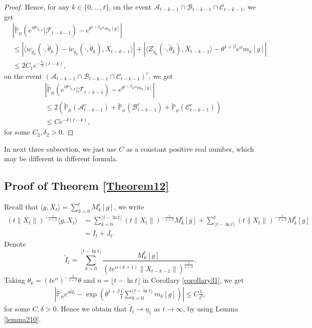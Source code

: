 \documentclass[12pt, a4paper]{amsart}
\theoremstyle{definition}
\numberwithin{equation}{section}
\begin{document}
\begin{proof}
Hence, for any $k\in\{0,...,t\}$, on the event $\mathcal{A}_{t-k-1}\cap\mathcal{B}_{t-k-1}\cap\mathcal{C}_{t-k-1}$, we get
\begin{align*}
   &\left|\mathbb{\tilde{P}}_{\mu}\left(e^{i\theta \gamma_{t,k}}|\mathcal{F}_{t-k-1}\right)-e^{\theta^{1+\beta}e^{\alpha}m_k[g]}\right|\\
   &\leq \left|\langle w_{g_k}(\cdot,\tilde{\theta}_k)-\tilde{w}_{g_k}(\cdot,\tilde{\theta}_k), X_{t-k-1}\rangle\right|
   +\left|\langle Z_{g_k}(\cdot,\tilde{\theta}_k),X_{t-k-1}\rangle-\theta^{1+\beta}e^{\alpha}m_k[g]\right|\\
   &\leq 2C_1 e^{-\frac{\delta_1}{2}(t-k)},
\end{align*}
on the event $(\mathcal{A}_{t-k-1}\cap\mathcal{B}_{t-k-1}\cap\mathcal{C}_{t-k-1})^c$, we get
\begin{align*}
    &\left|\mathbb{\tilde{P}}_{\mu}\left(e^{i\theta \gamma_{t,k}}|\mathcal{F}_{t-k-1}\right)-e^{\theta^{1+\beta}e^{\alpha}m_k[g]}\right|\\
    &\leq 2(\mathbb{\tilde{P}}_{\mu}(\mathcal{A}^c_{t-k-1})+\mathbb{\tilde{P}}_{\mu}(\mathcal{B}^c_{t-k-1})+\mathbb{\tilde{P}}_{\mu}(\mathcal{C}^c_{t-k-1}))\\
    &\leq C e^{-\delta(t-k)},
\end{align*}
for some $C_2,\delta_2>0$.
\end{proof}


In next three subsection, we just use $C$ as a constant positive real number, which may be different in different formula.
\subsection{Proof of Theorem \ref{Theorem12}}

    Recall that $\langle g,X_t\rangle=\sum_{k=0}^t M_k^t[g]$, we write
    \begin{align*}
        (t\|X_t\|)^{-\frac{1}{1+\beta}}\langle g,X_t\rangle&=\sum_{k=0}^{\lfloor t-\ln t \rfloor} (t\|X_t\|)^{-\frac{1}{1+\beta}}M_k^t[g]+\sum_{\lceil t-\ln t \rceil}^t (t\|X_t\|)^{-\frac{1}{1+\beta}}M_k^t[g]\\
        &=I_t+J_t.
    \end{align*}
    Denote
    $$\tilde{I}_t=\sum_{k=0}^{\lfloor t-\ln t \rfloor}\frac{M_k^t[g]}{(t e^{\alpha(k+1)}\|X_{t-k-1}\|)^{\frac{1}{1+\beta}}}.$$
    Taking $\theta_k=(t e^{\alpha})^{-\frac{1}{1+\beta}} \theta $ and $n={\lfloor t-\ln t \rfloor}$ in Corollary \ref{corollary31}, we get
    \begin{align*}
        \left|\mathbb{\tilde{P}}_{\mu}e^{i\theta\tilde{I}_t}-\exp\left(\theta^{1+\beta}\frac{1}{t}\sum_{k=0}^{\lfloor t-\ln t \rfloor}m_k[g]\right)\right|\leq C \frac{1}{t^{\delta}},
    \end{align*}
    for some $C,\delta>0$. Hence we obtain that $\tilde{I}_t\rightarrow\eta_1$ as $t\rightarrow \infty$, by using Lemma \ref{lemma210}.
    
\end{document}
